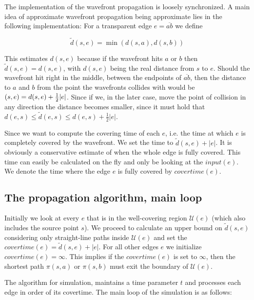 The implementation of the wavefront propagation is loosely synchronized. A main idea of 
approximate wavefront propagation being approximate lies in the following implementation: 
For a transparent edge $e=\overline{ab}$ we define 

$$\tilde{d}(s,e)=\min(d(s,a),d(s,b))$$ 

This estimates $d(s,e)$ because if the wavefront hits $a$ or $b$ then $\tilde{d}(s,e) = 
d(s,e)$, with $d(s,e)$ being the real distance from $s$ to $e$. Should the wavefront hit 
right in the middle, between the endpoints of $\overline{ab}$, then the distance to $a$ and 
$b$ from the point the wavefronts collides with would be $\title{d}(s,e)=d(s,e)+\frac{1}
{2}|e|$. Since if we, in the later case, move the point of collision in any direction the 
distance becomes smaller, since it must hold that $d(e,s) \leq \tilde{d}(e,s) \leq d(e,s) + 
\frac{1}{2}|e|$. 

Since we want to compute the covering time of each $e$, i.e. the time at which $e$ is 
completely covered by the wavefront. We set the time to $\tilde{d}(s,e)+|e|$. It is 
obviously a conservative estimate of when the whole edge is fully covered. This time can 
easily be calculated on the fly and only be looking at the $input(e)$. We denote the time 
where the edge $e$ is fully covered by $covertime(e)$. 

\subsection{The propagation algorithm, main loop}

Initially we look at every $e$ that is in the well-covering region $\mathcal{U}(e)$ (which 
also includes the source point $s$). We proceed to calculate an upper bound on $\tilde{d}
(s,e)$ considering only straight-line paths inside $\mathcal{U}(e)$ and set the 
$covertime(e) = \tilde{d}(s,e) + |e|$. For all other edges $e$ we initialize $covertime(e) = 
\infty$. This implies if the $covertime(e)$ is set to $\infty$, then the shortest path 
$\pi(s,a)$ or $\pi(s,b)$ must exit the boundary of $\mathcal{U}(e)$.

The algorithm for simulation, maintains a time parameter $t$ and processes each edge in 
order of its covertime. The main loop of the simulation is as follows:

